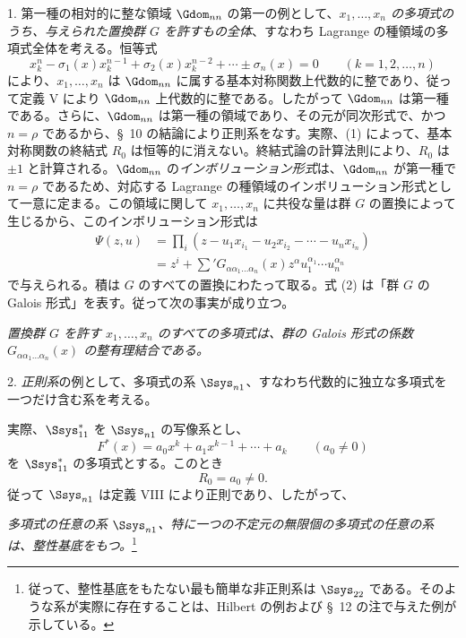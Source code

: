 \documentclass[11pt]{article}
\begin{document}
1. 第一種の相対的に整な領域 $\Gdom_{nn}$ の第一の例として、\emph{$x_1,\ldots,x_n$ の多項式のうち、与えられた置換群 $G$ を許すもの全体}、すなわち Lagrange の種領域の多項式全体を考える。恒等式
\begin{equation}
  x_k^n-\sigma_1(x)x_k^{n-1}+\sigma_2(x)x_k^{n-2}+\cdots\pm\sigma_n(x)=0
  \qquad(k=1,2,
\ldots,n)
\tag{1}
\end{equation}
により、$x_1,\ldots,x_n$ は $\Gdom_{nn}$ に属する基本対称関数上代数的に整であり、従って定義 V により $\Gdom_{nn}$ 上代数的に整である。したがって $\Gdom_{nn}$ は第一種である。さらに、$\Gdom_{nn}$ は第一種の領域であり、その元が同次形式で、かつ $n=\rho$ であるから、\S\ 10 の結論により正則系をなす。実際、(1) によって、基本対称関数の終結式 $R_0$ は恒等的に消えない。終結式論の計算法則により、$R_0$ は $\pm1$ と計算される。$\Gdom_{nn}$ の\emph{インボリューション形式}は、$\Gdom_{nn}$ が第一種で $n=\rho$ であるため、対応する Lagrange の種領域のインボリューション形式として一意に定まる。この領域に関して $x_1,\ldots,x_n$ に共役な量は群 $G$ の置換によって生じるから、このインボリューション形式は
\begin{equation}
\begin{aligned}
  \Psi(z,u)&=\prod_i
  (z-u_1x_{i_1}-u_2x_{i_2}-\cdots-u_nx_{i_n})\\
  &=z^i+\sum{}'G_{\alpha\alpha_1\ldots\alpha_n}(x)
  z^\alpha u_1^{\alpha_1}\cdots u_n^{\alpha_n}
\end{aligned}
\tag{2}
\end{equation}
で与えられる。積は $G$ のすべての置換にわたって取る。式 (2) は「群 $G$ の Galois 形式」を表す。従って次の事実が成り立つ。

\emph{置換群 $G$ を許す $x_1,\ldots,x_n$ のすべての多項式は、群の Galois 形式の係数 $G_{\alpha\alpha_1\ldots\alpha_n}(x)$ の整有理結合である。}

2. \emph{正則系}の例として、多項式の系 $\Ssys_{n1}$、すなわち代数的に独立な多項式を一つだけ含む系を考える。

実際、$\Ssys^*_{11}$ を $\Ssys_{n1}$ の写像系とし、
\[
  F^*(x)=a_0x^k+a_1x^{k-1}+\cdots+a_k\qquad(a_0\ne0)
\]
を $\Ssys^*_{11}$ の多項式とする。このとき
\begin{equation}
  R_0=a_0\ne0.
\tag{3}
\end{equation}
従って $\Ssys_{n1}$ は定義 VIII により正則であり、したがって、

\emph{多項式の任意の系 $\Ssys_{n1}$、特に一つの不定元の無限個の多項式の任意の系は、整性基底をもつ。}\footnote{従って、整性基底をもたない最も簡単な非正則系は $\Ssys_{22}$ である。そのような系が実際に存在することは、Hilbert の例および \S\ 12 の注で与えた例が示している。}
\end{document}
